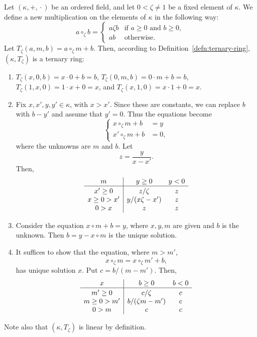 \begin{xmpl}
    Let\/ $(\kappa,+,{}\cdot{})$ be an ordered field, and let\/ $0 < \zeta \ne 1$ be a fixed element of\/ $\kappa$. We define a new multiplication on the elements of\/ $\kappa$ in the following way:
    \[
    a\circ_\zeta b =
    \begin{cases}
        a\zeta b & \text{if } a \ge 0 \text{ and } b \ge 0,\\
        ab & \text{otherwise}.
    \end{cases}
    \]
    Let $T_\zeta(a,m,b)=a\circ_\zeta m+b$. Then, according to Definition~\ref{defn:ternary-ring}, $(\kappa,T_\zeta)$ is a ternary ring:
    \begin{enumerate}[tr$_\arabic*$,font=\scshape]
        \item $T_\zeta(x,0,b)=x\cdot0+b=b$, $T_\zeta(0,m,b)=0\cdot m+b=b$, $T_\zeta(1,x,0)=1\cdot x+0=x$, and $T_\zeta(x,1,0)=x\cdot1+0=x$.

        \item Fix $x,x',y,y'\in\kappa$, with $x>x'$. Since these are constants, we can replace $b$ with $b-y'$ and assume that $y'=0$. Thus the equations become
        \[
            \left\{\begin{aligned}
                x\circ_\zeta m+b&=y\\
                x'\circ_\zeta m+b&=0,
            \end{aligned}
            \right.
        \]
        where the unknowns are $m$ and $b$. Let
        \[
            z = \frac y{x-x'}.
        \]
        Then,
        \[
            \begin{array}{c|ccc}
                 m&y\ge0&y<0\\
                 \hline\rule{0pt}{10pt}
                 x'\ge0&z/\zeta&z\\
                 x\ge0>x'&y/(x\zeta-x')&z\\
                 0>x&z&z
            \end{array}
        \]
        \item Consider the equation $x\circ m+b=y$, where $x,y,m$ are given and $b$ is the unknown. Then $b=y-x\circ m$ is the unique solution.

        \item It suffices to show that the equation, where $m>m'$,
        \[
                x\circ_\zeta m=
                x\circ_\zeta m'+b,
        \]
        has unique solution $x$. Put $c=b/(m-m')$. Then,
        \[
            \begin{array}{c|ccc}
                 x&b\ge0&b<0\\
                 \hline\rule{0pt}{10pt}
                 m'\ge0&c/\zeta&c\\
                 m\ge0>m'&b/(\zeta m-m')&c\\
                 0>m&c&c
            \end{array}
        \]
    \end{enumerate}
    Note also that $(\kappa,T_\zeta)$ is linear by definition.
\end{xmpl}

